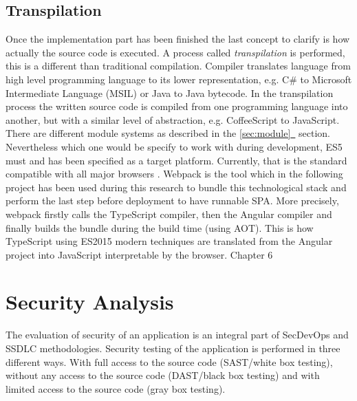 \documentclass{article} %
\newcommand{\fullref}[1]{\hyperref[#1]{\ref*{#1}\ \nameref*{#1}}}
\begin{document}
\subsection{Transpilation}
\label{sec:transpilation}
Once the implementation part has been finished the last concept to clarify is how actually the source code is executed. A process called \textit{transpilation} is performed, this is a different than traditional compilation. Compiler translates language from high level programming language to its lower representation, e.g. C\# to Microsoft Intermediate Language (MSIL) or Java to Java bytecode. In the transpilation process the written source code is compiled from one programming language into another, but with a similar level of abstraction, e.g. CoffeeScript to JavaScript.\\
\newline
There are different module systems as described in the \fullref{sec:module} section. Nevertheless which one would be specify to work with during development, ES5 must and has been specified as a target platform. Currently, that is the standard compatible with all major browsers \cite{bib:es5_browser_support}. Webpack is the tool which in the following project has been used during this research to bundle this technological stack and perform the last step before deployment to have runnable SPA. More precisely, webpack firstly calls the TypeScript compiler, then the Angular compiler and finally builds the bundle during the build time (using AOT). This is how TypeScript using ES2015 modern techniques are translated from the Angular project into JavaScript interpretable by the browser.
\newpage
\huge Chapter 6
\section{Security Analysis}
\normalsize The evaluation of security of an application is an integral part of SecDevOps and SSDLC methodologies. Security testing of the application is performed in three different ways. With full access to the source code (SAST/white box testing), without any access to the source code (DAST/black box testing) and with limited access to the source code (gray box testing).
\end{document}
